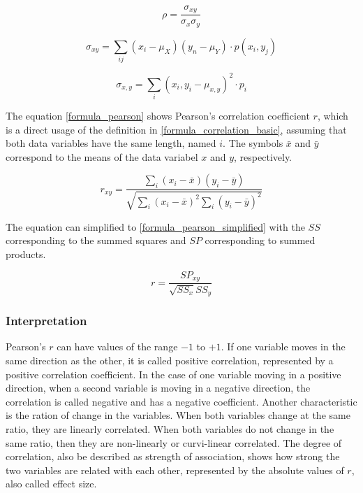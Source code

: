\documentclass[a4paper,12pt]{report}
\begin{document}
\smallskip

\begin{equation}
\label{formula_correlation_basic}
	\rho = \frac{\sigma_{xy}}{\sigma_{x}\sigma_{y}}
\end{equation}

\begin{equation}
\label{formula_correlation_covariant}
	\sigma_{xy} = \sum_{ij}(x_i-\mu_X)(y_n-\mu_Y) \cdot p(x_i,y_j)
\end{equation}

\begin{equation}
\label{formula_correlation_deviation}
	\sigma_{x,y} = \sum_{i}(x_i,y_i-\mu_{x,y})^2 \cdot p_i
\end{equation}

\bigskip

The equation \ref{formula_pearson} shows Pearson's correlation coefficient $r$, which is a direct usage of the definition in \ref{formula_correlation_basic}, assuming that both data variables have the same length, named $i$. The symbols $\bar{x}$ and $\bar{y}$ correspond to the means of the data variabel $x$ and $y$, respectively. \cite{BenestyChenHuang2009,Zychlinski2018}

\smallskip

\begin{equation}
\label{formula_pearson}	
	r_{xy} =  \frac{\sum_{i}{(x_i-\bar{x})(y_i-\bar{y})}}{\sqrt{\sum_{i}{(x_i-\bar{x})^2}\sum_{i}{(y_i-\bar{y})^2}}}
\end{equation}

\bigskip

The equation can simplified to \ref{formula_pearson_simplified} with the $SS$ corresponding to the summed squares and $SP$ corresponding to summed products.

\smallskip

\begin{equation}
\label{formula_pearson_simplified}
	r =  \frac{SP_{xy}}{\sqrt{SS_x}{SS_y}}
\end{equation}

\subsubsection{Interpretation}
Pearson's $r$ can have values of the range $-1$ to $+1$. If one variable moves in the same direction as the other, it is called positive correlation, represented by a positive correlation coefficient. In the case of one variable moving in a positive direction, when a second variable is moving in a negative direction, the correlation is called negative and has a negative coefficient. Another characteristic is the ration of change in the variables. When both variables change at the same ratio, they are linearly correlated. When both variables do not change in the same ratio, then they are non-linearly or curvi-linear correlated. The degree of correlation,  also be described as strength of association, shows how strong the two variables are related with each other, represented by the absolute values of $r$, also called effect size. 
\end{document}
